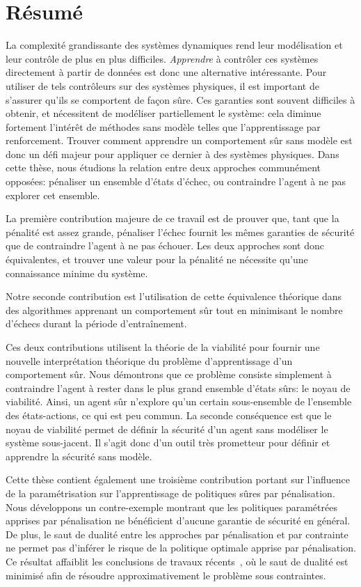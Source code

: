 \chapter*{Résumé}

La complexité grandissante des systèmes dynamiques rend leur modélisation et leur contrôle de plus en plus difficiles.\emph{ Apprendre} à contrôler ces systèmes directement à partir de données est donc une alternative intéressante. Pour utiliser de tels contrôleurs sur des systèmes physiques, il est important de s'assurer qu'ils se comportent de façon sûre. Ces garanties sont souvent difficiles à obtenir, et nécessitent de modéliser partiellement le système: cela diminue fortement l'intérêt de méthodes sans modèle telles que l'apprentissage par renforcement. Trouver comment apprendre un comportement sûr sans modèle est donc un défi majeur pour appliquer ce dernier à des systèmes physiques. Dans cette thèse, nous étudions la relation entre deux approches communément opposées: pénaliser un ensemble d'états d'échec, ou contraindre l'agent à ne pas explorer cet ensemble.\par
La première contribution majeure de ce travail est de prouver que, tant que la pénalité est assez grande, pénaliser l'échec fournit les mêmes garanties de sécurité que de contraindre l'agent à ne pas échouer. Les deux approches sont donc équivalentes, et trouver une valeur pour la pénalité ne nécessite qu'une connaissance minime du système.\par
Notre seconde contribution est l'utilisation de cette équivalence théorique dans des algorithmes apprenant un comportement sûr tout en minimisant le nombre d'échecs durant la période d'entraînement.\par
Ces deux contributions utilisent la théorie de la viabilité pour fournir une nouvelle interprétation théorique du problème d'apprentissage d'un comportement sûr. Nous démontrons que ce problème consiste simplement à contraindre l'agent à rester dans le plus grand ensemble d'états sûrs: le noyau de viabilité. Ainsi, un agent sûr n'explore qu'un certain sous-ensemble de l'ensemble des états-actions, ce qui est peu commun. La seconde conséquence est que le noyau de viabilité permet de définir la sécurité d'un agent sans modéliser le système sous-jacent. Il s'agit donc d'un outil très prometteur pour définir et apprendre la sécurité sans modèle.\par
Cette thèse contient également une troisième contribution portant sur l'influence de la paramétrisation sur l'apprentissage de politiques sûres par pénalisation. Nous développons un contre-exemple montrant que les politiques paramétrées apprises par pénalisation ne bénéficient d'aucune garantie de sécurité en général. De plus, le saut de dualité entre les approches par pénalisation et par contrainte ne permet pas d'inférer le risque de la politique optimale apprise par pénalisation. Ce résultat affaiblit les conclusions de travaux récents~\cite{paternain2019safe}, où le saut de dualité est minimisé afin de résoudre approximativement le problème sous contraintes.